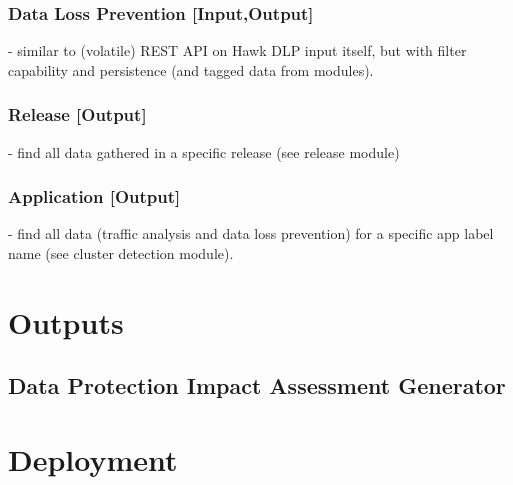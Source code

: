 \subsubsection{Data Loss Prevention [Input,Output]}
- similar to (volatile) REST API on Hawk DLP input itself, but with filter capability and persistence (and tagged data from modules). 

\subsubsection{Release [Output]}
- find all data gathered in a specific release (see release module)

\subsubsection{Application [Output]}
- find all data (traffic analysis and data loss prevention) for a specific app label name (see cluster detection module).

\section{Outputs}
\subsection{Data Protection Impact Assessment Generator}
\section{Deployment}



